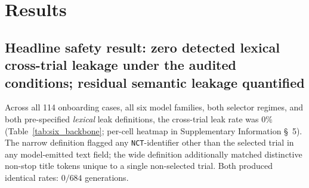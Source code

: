 \documentclass[11pt]{article}
\begin{document}
\section{Results}
\label{sec:results}

\subsection{Headline safety result: zero detected lexical cross-trial leakage under the audited conditions; residual semantic leakage quantified}
\label{sec:results_leak}

Across all 114 onboarding cases, all six model families, both selector regimes, and both pre-specified \emph{lexical} leak definitions, the cross-trial leak rate was $0\%$ (Table~\ref{tab:six_backbone}; per-cell heatmap in Supplementary Information \S~5). The narrow definition flagged any \texttt{NCT}-identifier other than the selected trial in any model-emitted text field; the wide definition additionally matched distinctive non-stop title tokens unique to a single non-selected trial. Both produced identical rates: $0/684$ generations.
\end{document}
